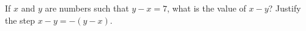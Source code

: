 If $x$ and $y$ are numbers such that $y-x=7$, what is the value of $x-y$? Justify the step $x-y=-(y-x)$.
